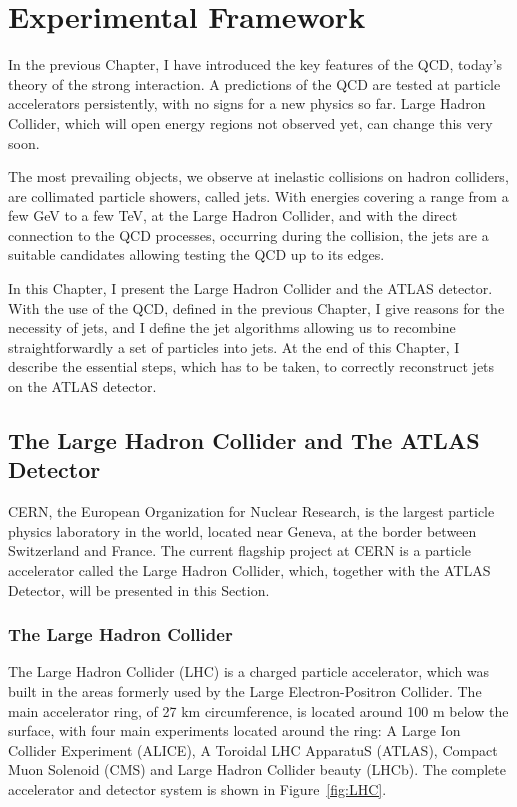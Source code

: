 \chapter{Experimental Framework}


In the previous Chapter, I have introduced the key features of the QCD, today's
theory of the strong interaction. A predictions of the QCD are tested at particle
accelerators persistently, with no signs for a new physics so far. 
Large Hadron Collider, which will open energy regions not observed yet, can
change this very soon.

The most prevailing objects, we observe at inelastic collisions on hadron
colliders, are collimated particle showers, called jets. With energies covering
a range from a few GeV to a few TeV, at the Large Hadron Collider, and with the
direct connection to the QCD processes, occurring during the collision, the jets
are a suitable candidates allowing testing the QCD up to its edges.

In this Chapter, I present the Large Hadron Collider and the ATLAS detector.
With the use of the QCD, defined in the previous Chapter, I give reasons for the
necessity of jets, and I define the jet algorithms allowing us to
recombine straightforwardly a
set of particles into jets. At the end of this Chapter, I describe the essential
steps, which has to be taken, to correctly reconstruct jets on the ATLAS
detector.

\section{The Large Hadron Collider and The ATLAS Detector}

CERN, the European Organization for Nuclear Research, is the largest particle
physics laboratory in the world, located near Geneva, at the border between
Switzerland and France. The current flagship project at CERN is a particle
accelerator called the Large Hadron Collider, which, together with the
ATLAS Detector, will be presented in this Section.

\subsection{The Large Hadron Collider}

The Large Hadron Collider (LHC) \cite{LHC, LHCPastPresentFuture} is a charged
particle accelerator, which was built in the areas formerly used by the Large
Electron-Positron Collider.  The main accelerator ring, of 27 km circumference,
is located around 100 m below the surface, with four main experiments located
around the ring: A Large Ion Collider Experiment (ALICE), A Toroidal LHC
ApparatuS (ATLAS), Compact Muon Solenoid (CMS) and Large Hadron Collider beauty
(LHCb). The complete accelerator and detector system is shown in
Figure~\ref{fig:LHC}.


